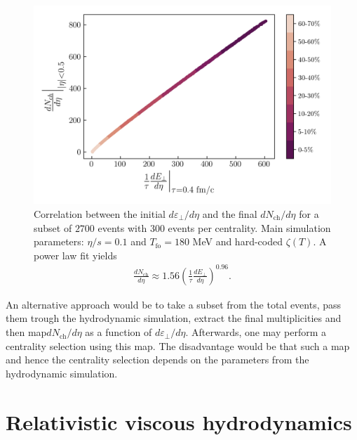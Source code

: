 \begin{figure}[!hbt]
	\includegraphics[width=\textwidth]{images/dnch_etot_bulk.png}
	\caption{\normalsize Correlation between the initial $d\varepsilon_\perp/d\eta$ and the final $dN_\mathrm{ch}/d\eta$ for a subset of $2700$ events with $300$ events per centrality. Main simulation parameters: $\eta/s=0.1$ and $T_\mathrm{fo}=180$ MeV and hard-coded $\zeta(T)$. A power law fit yields
	\begin{align*}
	    \frac{dN_\text{ch}}{d\eta}\approx 1.56 \left(\frac{1}{\tau}\frac{dE_\perp}{d\eta}\right)^{0.96}.
	\end{align*}
	} 
\end{figure}

An alternative approach \cite{mcdonaldhydro} would be to take a subset from the total events, pass them trough the hydrodynamic simulation, extract the final multiplicities and then map$dN_\text{ch}/d\eta$ as a function of $d\varepsilon_\perp/d\eta$. Afterwards, one may perform a centrality selection using this map. The disadvantage would be that such a map and hence the centrality selection depends on the parameters from the hydrodynamic simulation. 

\section{Relativistic viscous hydrodynamics}
